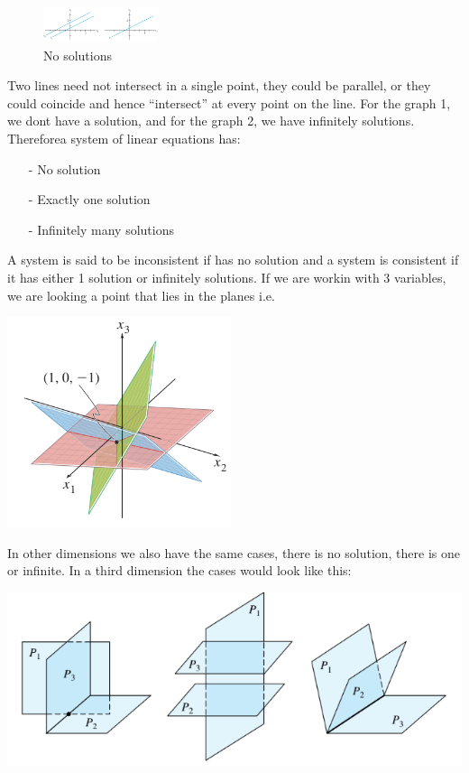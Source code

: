 \documentclass{article}
\begin{document}
\begin{figure} 
    \centering
    \includegraphics[width=0.3\textwidth]{image1.png}
    \caption{No solutions}
\end{figure}

Two lines need not intersect in a single point, they could be parallel, or they could coincide and hence “intersect” at every point on the line. For the graph 1, we dont have a solution, and for the graph 2, we have infinitely solutions. Thereforea system of linear equations has:

\begin{itemize}
    \item[-] No solution 
    \item[-] Exactly one solution
    \item[-] Infinitely many solutions \newline
\end{itemize} 

A system is said to be inconsistent if has no solution and a system is consistent if it has either 1 solution or infinitely solutions. If we are workin with 3 variables, we are looking a point that lies in the planes i.e.

\includegraphics{image2.png}

In other dimensions we also have the same cases, there is no solution, there is one or infinite. In a third dimension the cases would look like this: 

\includegraphics{image4.png}
\end{document}
